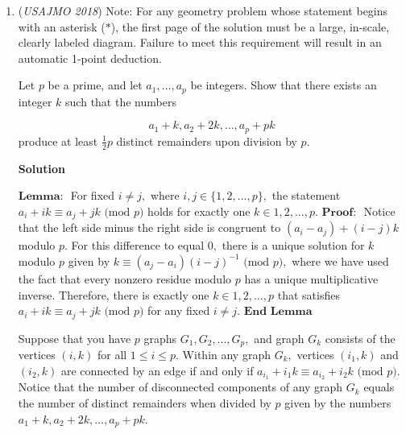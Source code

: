 \begin{enumerate}
 Second, consider a right triangle $ABC,$ inscribed in a circle of radius $2,$ with side lengths $a = \sqrt{6}-\sqrt{2}, b = 4, c = \sqrt{6}+\sqrt{2}.$ This generates the polynomial equation
 \[x^4 + \left(\sqrt{6}-\sqrt{2}\right)x^3 + 4x^2 + \left(\sqrt{6}+\sqrt{2}\right)x + 1 = \left(\frac{\sqrt{6}+\sqrt{2}}{2}x + 1\right)^2\left(\left(\frac{\sqrt{6}-\sqrt{2}}{2}x\right)^2+1\right) = 0.\]This is satisfied by $x=-\frac{\sqrt{6}-\sqrt{2}}{2}.$

 It follows that the possible values of $x$ are $-\frac{\sqrt{6}+\sqrt{2}}{2}$ and $-\frac{\sqrt{6}-\sqrt{2}}{2}.$

 Fun fact: these solutions correspond to a $15$-$75$-$90$ triangle.

 (sujaykazi)

 


 


	\item (\textit{USAJMO 2018}) Note: For any geometry problem whose statement begins with an asterisk ($*$), the first page of the solution must be a large, in-scale, clearly labeled diagram. Failure to meet this requirement will result in an automatic 1-point deduction. 


 Let $p$ be a prime, and let $a_1, \dots, a_p$ be integers. Show that there exists an integer $k$ such that the numbers

 \[a_1 + k, a_2 + 2k, \dots, a_p + pk\]produce at least $\frac{1}{2} p$ distinct remainders upon division by $p$.


 



\textbf{Solution}

$\textbf{Lemma: }$ For fixed $i\neq j,$ where $i, j\in\{1, 2, ..., p\},$ the statement $a_i + ik\equiv a_j + jk\text{ (mod } p\text{)}$ holds for exactly one $k\in {1, 2, ..., p}.$
$\textbf{Proof: }$ Notice that the left side minus the right side is congruent to $(a_i - a_j) + (i - j)k$ modulo $p.$ For this difference to equal $0,$ there is a unique solution for $k$ modulo $p$ given by $k\equiv (a_j - a_i)(i - j)^{-1}\text{ (mod } p\text{)},$ where we have used the fact that every nonzero residue modulo $p$ has a unique multiplicative inverse. Therefore, there is exactly one $k\in {1, 2, ..., p}$ that satisfies $a_i + ik\equiv a_j + jk\text{ (mod } p\text{)}$ for any fixed $i\neq j. \textbf{ End Lemma}$

 Suppose that you have $p$ graphs $G_1, G_2, ..., G_p,$ and graph $G_k$ consists of the vertices $(i, k)$ for all $1\le i\le p.$ Within any graph $G_k,$ vertices $(i_1, k)$ and $(i_2, k)$ are connected by an edge if and only if $a_{i_1} + i_1k\equiv a_{i_2} + i_2k\text{ (mod } p\text{)}.$ Notice that the number of disconnected components of any graph $G_k$ equals the number of distinct remainders when divided by $p$ given by the numbers $a_1 + k, a_2 + 2k, ..., a_p + pk.$


\end{enumerate}
